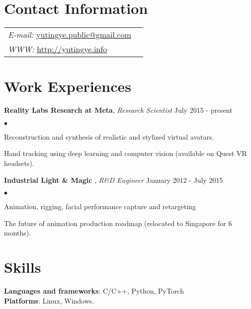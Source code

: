 \documentclass[margin,line]{res}
\newenvironment{list2}{
  \begin{list}{$\bullet$}{%
      \setlength{\itemsep}{0in}
      \setlength{\parsep}{0in} \setlength{\parskip}{0in}
      \setlength{\topsep}{0in} \setlength{\partopsep}{0in} 
      \setlength{\leftmargin}{0.2in}}}{\end{list}}
\begin{document}

\begin{resume}
\section{\sc Contact Information}
\vspace{.05in}
\begin{tabular}{@{}p{3in}p{3in}}
{\it E-mail:}    \href{mailto:yutingye.public@gmail.com}{yutingye.public@gmail.com} \\
{\it WWW:}  \href{http://yutingye.info}{http://yutingye.info} \\ 
\end{tabular}

\section{\sc Work Experiences}
{\bf Reality Labs Research at Meta}, {\em Research Scientist}  \hfill July 2015 - present \\
\begin{list2}
\vspace*{-.15in}
\item Reconstruction and synthesis of realistic and stylized virtual avatars.
\item Hand tracking using deep learning and computer vision (available on Quest VR headsets).
\end{list2}

{\bf Industrial Light \& Magic} , {\em R\&D Engineer} \hfill January 2012 - July 2015 \\
\begin{list2}
\vspace*{-.15in}
\item Animation, rigging,  facial performance capture and retargeting
\item The future of animation production roadmap (relocated to Singapore for 6 months).
\end{list2}

\section{\sc Skills}
{\bf Languages and frameworks}: C/C++, Python, PyTorch\\
{\bf Platforms}: Linux, Windows. 



\end{resume}
\end{document}

